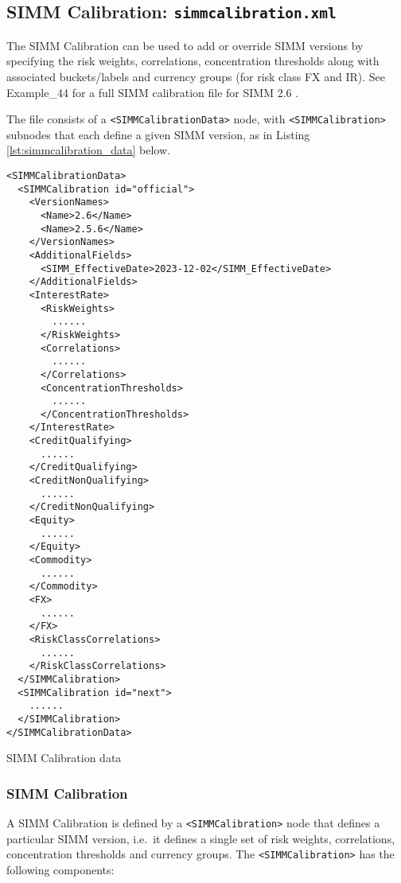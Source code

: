 \subsection{SIMM Calibration: {\tt simmcalibration.xml}}\label{sec:simmcalibration}

The SIMM Calibration can be used to add or override SIMM versions by specifying the risk weights, correlations,
concentration thresholds along with associated buckets/labels and currency groups (for risk class FX and IR).
See Example\_44 for a full SIMM calibration file for SIMM 2.6 \cite{SIMM2.6}.

The file consists of a {\tt <SIMMCalibrationData>} node, with {\tt <SIMMCalibration>} subnodes that each define a given
SIMM version, as in Listing \ref{lst:simmcalibration_data} below.

\begin{listing}[H]
\begin{verbatim}
<SIMMCalibrationData>
  <SIMMCalibration id="official">
    <VersionNames>
      <Name>2.6</Name>
      <Name>2.5.6</Name>
    </VersionNames>
    <AdditionalFields>
      <SIMM_EffectiveDate>2023-12-02</SIMM_EffectiveDate>
    </AdditionalFields>
    <InterestRate>
      <RiskWeights>
        ......
      </RiskWeights>
      <Correlations>
        ......
      </Correlations>
      <ConcentrationThresholds>
        ......
      </ConcentrationThresholds>
    </InterestRate>
    <CreditQualifying>
      ......
    </CreditQualifying>
    <CreditNonQualifying>
      ......
    </CreditNonQualifying>
    <Equity>
      ......
    </Equity>
    <Commodity>
      ......
    </Commodity>
    <FX>
      ......
    </FX>
    <RiskClassCorrelations>
      ......
    </RiskClassCorrelations>
  </SIMMCalibration>
  <SIMMCalibration id="next">
    ......
  </SIMMCalibration>
</SIMMCalibrationData>
\end{verbatim}
\caption{SIMM Calibration data}
\label{lst:simmcalibration_data}
\end{listing}

\subsubsection{SIMM Calibration}

A SIMM Calibration is defined by a {\tt <SIMMCalibration>} node that defines a particular SIMM version, i.e.\ it defines a single set of risk weights, correlations, concentration thresholds and currency groups. The {\tt <SIMMCalibration>} has the following components:

